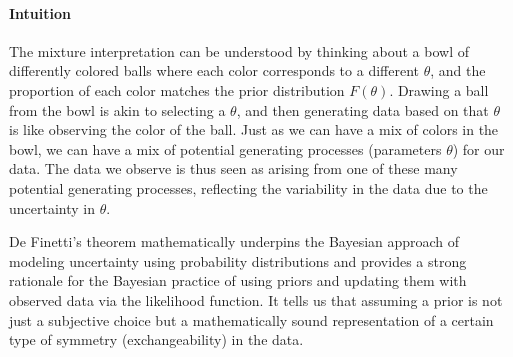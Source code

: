 \documentclass{article}
\begin{document}
\paragraph{Intuition}
The mixture interpretation can be understood by thinking about a bowl of differently colored balls where each color corresponds to a different \( \theta \), and the proportion of each color matches the prior distribution \( F(\theta) \). Drawing a ball from the bowl is akin to selecting a \( \theta \), and then generating data based on that \( \theta \) is like observing the color of the ball. Just as we can have a mix of colors in the bowl, we can have a mix of potential generating processes (parameters \( \theta \)) for our data. The data we observe is thus seen as arising from one of these many potential generating processes, reflecting the variability in the data due to the uncertainty in \( \theta \).



De Finetti’s theorem mathematically underpins the Bayesian approach of modeling uncertainty using probability distributions and provides a strong rationale for the Bayesian practice of using priors and updating them with observed data via the likelihood function. It tells us that assuming a prior is not just a subjective choice but a mathematically sound representation of a certain type of symmetry (exchangeability) in the data.
\end{document}
